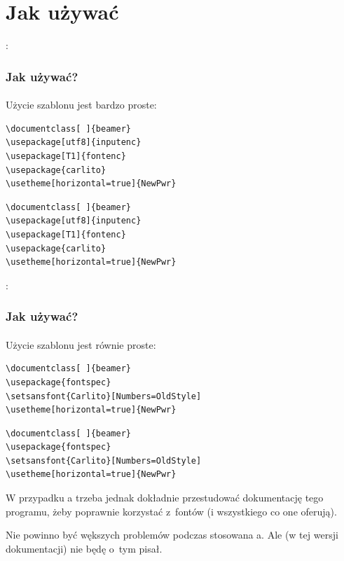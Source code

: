 \section{Jak używać}

:

\begin{frame}[fragile]
 \frametitle<presentation>{Jak używać?}
 \framesubtitle{}
 Użycie szablonu jest bardzo proste:
 \ifpdf
  \begin{lstlisting}  
\documentclass[ ]{beamer}
\usepackage[utf8]{inputenc}
\usepackage[T1]{fontenc}
\usepackage{carlito}
\usetheme[horizontal=true]{NewPwr}
\end{lstlisting}
 \else
  \begin{verbatim}  
\documentclass[ ]{beamer}
\usepackage[utf8]{inputenc}
\usepackage[T1]{fontenc}
\usepackage{carlito}
\usetheme[horizontal=true]{NewPwr}
\end{verbatim}
 \fi
\end{frame}

:

\begin{frame}[fragile]
 \frametitle<presentation>{Jak używać?}
 \framesubtitle{}
 Użycie szablonu jest równie proste:
 \ifpdf
  \begin{lstlisting}  
\documentclass[ ]{beamer}
\usepackage{fontspec}
\setsansfont{Carlito}[Numbers=OldStyle]
\usetheme[horizontal=true]{NewPwr}
\end{lstlisting}
 \else
  \begin{verbatim}  
\documentclass[ ]{beamer}
\usepackage{fontspec}
\setsansfont{Carlito}[Numbers=OldStyle]
\usetheme[horizontal=true]{NewPwr}
\end{verbatim}
 \fi
\end{frame}

W przypadku a trzeba jednak dokładnie przestudować dokumentację tego programu, żeby poprawnie korzystać z~fontów (i wszystkiego co one oferują).

Nie powinno być wększych problemów podczas stosowana a.  Ale (w tej wersji dokumentacji) nie będę o~tym pisał.

%

